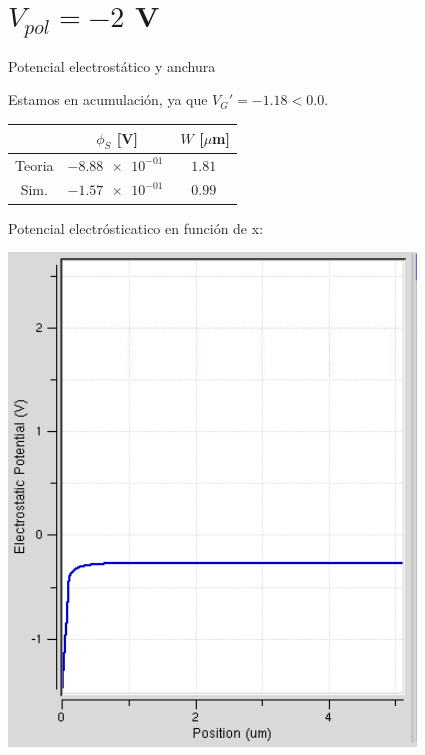 \documentclass{/home/daniel/GitHub/USC-Physics-Degree-Notes/Notes/Presentacion}
\begin{document}
\section{$V_{pol}=-2$ V} 


\begin{frame}{Potencial electrostático y anchura}
    \begin{minipage}{0.4\linewidth}
        Estamos en acumulación, ya que $V_G'=-1.18<0.0$.
        
        \vspace*{1em}

        \begin{center}
            \small
            \begin{tabular}{ccc}
                \toprule
                & $\phi_S$ [V] & $W$ [$\mu$m]   \\ \midrule
                Teoria & $\SI{-8.88e-01}{}$ & $\SI{1.81}{}$ \\
                Sim.   & $\SI{-1.57e-01}{}$ & $\SI{0.99}{}$  \\
                \bottomrule
            \end{tabular}
        \end{center}
    \end{minipage}
    \hfill
    \begin{minipage}{0.55\linewidth} \centering
        Potencial electrósticatico en función de x:

        \vspace*{1em}
        
        \includegraphics[width=0.7\linewidth]{../Imagenes/2-Potencial.png}
    \end{minipage}
\end{frame}
\end{document}
